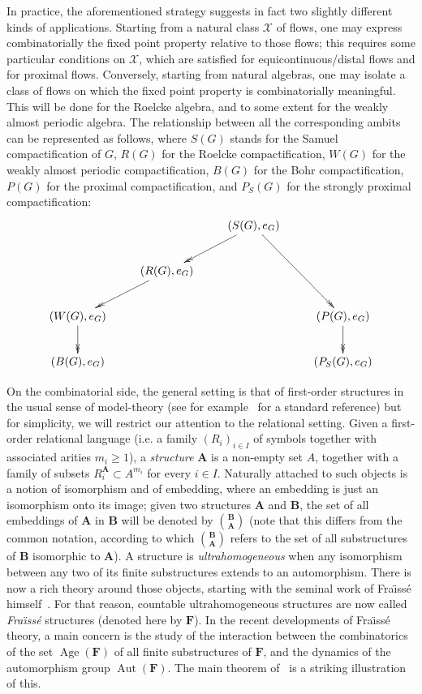 \documentclass[11pt]{article}
\theoremstyle{definition}
\numberwithin{equation}{section}
\numberwithin{figure}{section}
\numberwithin{table}{section}
\newcommand*{\mA}{\mathbf{A}}
\newcommand*{\mB}{\mathbf{B}}
\newcommand*{\mF}{\mathbf{F}}
\DeclareMathOperator{\Aut}{Aut}
\DeclareMathOperator{\Age}{Age}
\begin{document}
In practice, the aforementioned strategy suggests in fact two slightly different kinds of applications. Starting from a natural class $\mathcal X$ of flows, one may express combinatorially the fixed point property relative to those flows; this requires some particular conditions on $\mathcal X$, which are satisfied for equicontinuous/distal flows and for proximal flows. Conversely, starting from natural algebras, one may isolate a class of flows on which the fixed point property is combinatorially meaningful. This will be done for the Roelcke algebra, and to some extent for the weakly almost periodic algebra. The relationship between all the corresponding ambits can be represented as follows, where $S(G)$ stands for the Samuel compactification of $G$, $R(G)$ for the Roelcke compactification, $W(G)$ for the weakly almost periodic compactification, $B(G)$ for the Bohr compactification, $P(G)$ for the proximal compactification, and $P_{S}(G)$ for the strongly proximal compactification:
\[
\xymatrix{ & & (S(G),e_{G}) \ar@{->>}[ld] \ar@{->>}[rdd]& \\
& (R(G),e_{G}) \ar@{->>}[ld] & & \\
(W(G),e_{G}) \ar@{->>}[d] & & & (P(G),e_{G}) \ar@{->>}[d]\\
(B(G),e_{G})& & & (P_{S}(G),e_{G}) }
\]


On the combinatorial side, the general setting is that of first-order structures in the usual sense of model-theory (see for example~\cite{H} for a standard reference) but for simplicity, we will restrict our attention to the relational setting. Given a first-order relational language (i.e. a family $(R_{i})_{i\in I}$ of symbols together with associated arities $m_{i}\geq 1$), a \emph{structure} $\mA$ is a non-empty set $A$, together with a family of subsets $R^{\mA}_{i}\subset A^{m_{i}}$ for every $i\in I$. Naturally attached to such objects is a notion of isomorphism and of embedding, where an embedding is just an isomorphism onto its image; given two structures $\mA$ and $\mB$, the set of all embeddings of $\mA$ in $\mB$ will be denoted by $\binom{\mB}{\mA}$ (note that this differs from the common notation, according to which $\binom{\mB}{\mA}$ refers to the set of all substructures of $\mB$ isomorphic to $\mA$). A structure is \emph{ultrahomogeneous} when any isomorphism between any two of its finite substructures extends to an automorphism. There is now a rich theory around those objects, starting with the seminal work of Fra\"{\i}ss\'e himself~\cite{Fr0}. For that reason, countable ultrahomogeneous structures are now called \emph{Fra\"{\i}ss\'e} structures (denoted here by $\mF$). In the recent developments of Fra\"{\i}ss\'e theory, a main concern is the study of the interaction between the combinatorics of the set $\Age(\mF)$ of all finite substructures of $\mF$, and the dynamics of the automorphism group $\Aut(\mF)$. The main theorem of~\cite{KPT} is a striking illustration of this.
\end{document}
